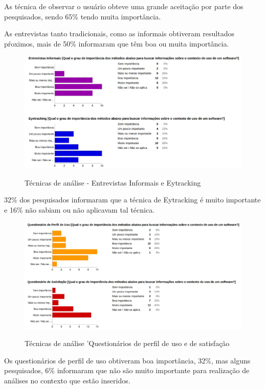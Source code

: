 	As técnica de observar o usuário obteve uma grande aceitação por parte dos pesquisados, sendo 65\% tendo muita importância.
	 
	As entrevistas tanto tradicionais, como as informais obtiveram resultados pŕoximos, mais de 50\% informaram que têm boa ou muita importância.
		
	\begin{figure}[!h]
    	\centering
    	\includegraphics[keepaspectratio=true,scale=0.50]
      		{figuras/analise2.eps}
    	\label{check04}
		\caption{Técnicas de análise - Entrevistas Informais e Eytracking}
	\end{figure}

	32\% dos pesquisados informaram que a técnica de Eytracking é muito importante e 16\% não sabiam ou não aplicavam tal técnica.
		
	\begin{figure}[!h]
    	\centering
    	\includegraphics[keepaspectratio=true,scale=0.50]
      		{figuras/analise3.eps}
    	\label{check04}
		\caption{Técnicas de análise 'Questionários de perfil de uso e de satisfação}
	\end{figure}
	
	Os questionários de perfil de uso obtiveram boa importância, 32\%, mas alguns pesquisados, 6\% informaram que não são muito importante para realização de análises no contexto que estão inseridos.
	
